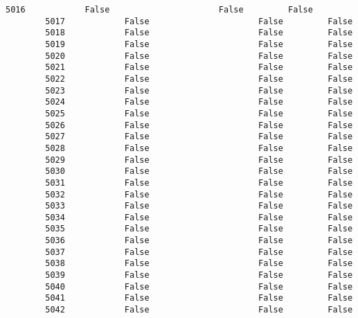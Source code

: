\documentclass[11pt]{article}
\begin{document}
\begin{Verbatim}[commandchars=\\\{\}]
        5016            False                      False         False   
        5017            False                      False         False   
        5018            False                      False         False   
        5019            False                      False         False   
        5020            False                      False         False   
        5021            False                      False         False   
        5022            False                      False         False   
        5023            False                      False         False   
        5024            False                      False         False   
        5025            False                      False         False   
        5026            False                      False         False   
        5027            False                      False         False   
        5028            False                      False         False   
        5029            False                      False         False   
        5030            False                      False         False   
        5031            False                      False         False   
        5032            False                      False         False   
        5033            False                      False         False   
        5034            False                      False         False   
        5035            False                      False         False   
        5036            False                      False         False   
        5037            False                      False         False   
        5038            False                      False         False   
        5039            False                      False         False   
        5040            False                      False         False   
        5041            False                      False         False   
        5042            False                      False         False   
        

\end{Verbatim}
\end{document}
